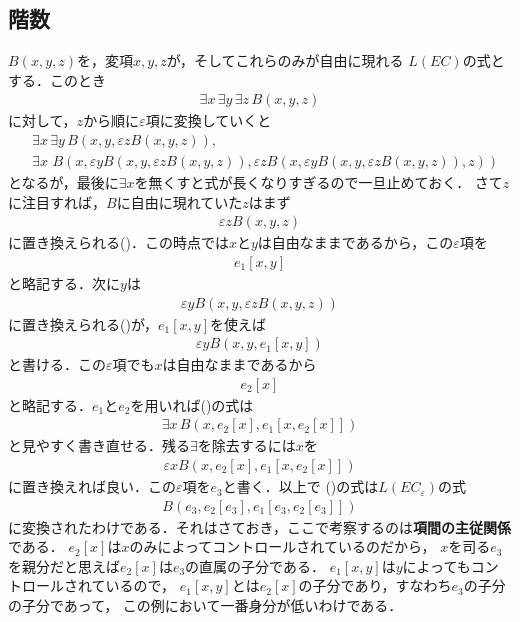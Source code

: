\subsection{階数}
	$B(x,y,z)$を，変項$x,y,z$が，そしてこれらのみが自由に現れる
	$L(EC)$の式とする．このとき
	\begin{align}
		\exists x\, \exists y\, \exists z\, B(x,y,z) \label{fom:rank_of_epsilon_term_3}
	\end{align}
	に対して，$z$から順に$\varepsilon$項に変換していくと
	\begin{align}
		&\exists x\, \exists y\, B(x,y,\varepsilon z B(x,y,z)), \label{fom:rank_of_epsilon_term_1} \\
		&\exists x\, \, B(x,\varepsilon y B(x,y,\varepsilon z B(x,y,z)),\varepsilon z B(x,\varepsilon y B(x,y,\varepsilon z B(x,y,z)),z)) \label{fom:rank_of_epsilon_term_2}
	\end{align}
	となるが，最後に$\exists x$を無くすと式が長くなりすぎるので一旦止めておく．
	さて$z$に注目すれば，$B$に自由に現れていた$z$はまず
	\begin{align}
		\varepsilon z B(x,y,z)
	\end{align}
	に置き換えられる()．この時点では$x$と$y$は自由なままであるから，この$\varepsilon$項を
	\begin{align}
		e_{1}[x,y]
	\end{align}
	と略記する．次に$y$は
	\begin{align}
		\varepsilon y B(x,y,\varepsilon z B(x,y,z))
	\end{align}
	に置き換えられる()が，$e_{1}[x,y]$を使えば
	\begin{align}
		\varepsilon y B(x,y,e_{1}[x,y])
	\end{align}
	と書ける．この$\varepsilon$項でも$x$は自由なままであるから
	\begin{align}
		e_{2}[x]
	\end{align}
	と略記する．$e_{1}$と$e_{2}$を用いれば()の式は
	\begin{align}
		\exists x\, B\left(x,e_{2}[x],e_{1}[x,e_{2}[x]]\right)
	\end{align}
	と見やすく書き直せる．残る$\exists$を除去するには$x$を
	\begin{align}
		\varepsilon x B\left(x,e_{2}[x],e_{1}[x,e_{2}[x]]\right)
	\end{align}
	に置き換えれば良い．この$\varepsilon$項を$e_{3}$と書く．以上で
	()の式は$L(EC_{\varepsilon})$の式
	\begin{align}
		B\left(e_{3},e_{2}[e_{3}],e_{1}[e_{3},e_{2}[e_{3}]]\right)
	\end{align}
	に変換されたわけである．それはさておき，ここで考察するのは{\bf 項間の主従関係}である．
	$e_{2}[x]$は$x$のみによってコントロールされているのだから，
	$x$を司る$e_{3}$を親分だと思えば$e_{2}[x]$は$e_{3}$の直属の子分である．
	$e_{1}[x,y]$は$y$によってもコントロールされているので，
	$e_{1}[x,y]$とは$e_{2}[x]$の子分であり，すなわち$e_{3}$の子分の子分であって，
	この例において一番身分が低いわけである．
	
